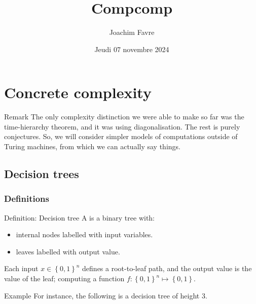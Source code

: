 \documentclass[a4paper]{article}
\title{Compcomp}
\author{Joachim Favre}
\date{Jeudi 07 novembre 2024}
\begin{document}
\maketitle


\section{Concrete complexity}

\begin{parag}{Remark}
    The only complexity distinction we were able to make so far was the time-hierarchy theorem, and it was using diagonalisation. The rest is purely conjectures. So, we will consider simpler models of computations outside of Turing machines, from which we can actually say things.
\end{parag}

\subsection{Decision trees}

\subsubsection{Definitions}

\begin{parag}{Definition: Decision tree}
    A  is a binary tree with:
    \begin{itemize}
        \item internal nodes labelled with input variables.
        \item leaves labelled with output value.
    \end{itemize}
    
    Each input $x \in \left\{0, 1\right\}^n$ defines a root-to-leaf path, and the output value is the value of the leaf; computing a function $f: \left\{0, 1\right\}^n \mapsto \left\{0, 1\right\}$.

    \begin{subparag}{Example}
        For instance, the following is a decision tree of height $3$.
    \end{subparag}
\end{parag}
\end{document}
